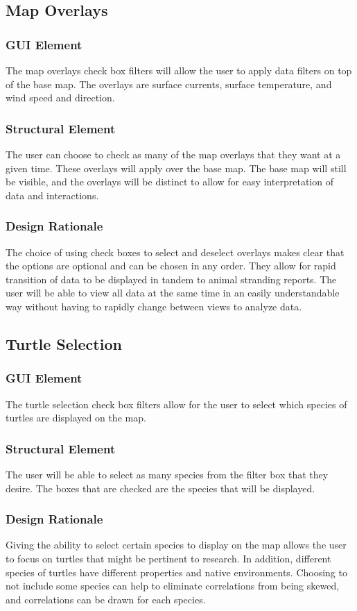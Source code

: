 \documentclass[onecolumn, draftclsnofoot,10pt, compsoc]{IEEEtran}
\begin{document}
\begin{singlespace}
        \subsection{Map Overlays}
            \subsubsection{GUI Element}
            The map overlays check box filters will allow the user to apply data filters on top of the base map.  The overlays are surface currents, surface temperature, and wind speed and direction.
            \subsubsection{Structural Element}
            The user can choose to check as many of the map overlays that they want at a given time.  These overlays will apply over the base map.  The base map will still be visible, and the overlays will be distinct to allow for easy interpretation of data and interactions.
            \subsubsection{Design Rationale}
            The choice of using check boxes to select and deselect overlays makes clear that the options are optional and can be chosen in any order.  They allow for rapid transition of data to be displayed in tandem to animal stranding reports.  The user will be able to view all data at the same time in an easily understandable way without having to rapidly change between views to analyze data.
    \subsection{Turtle Selection}
            \subsubsection{GUI Element}
            The turtle selection check box filters allow for the user to select which species of turtles are displayed on the map.
            \subsubsection{Structural Element}
            The user will be able to select as many species from the filter box that they desire.  The boxes that are checked are the species that will be displayed.
            \subsubsection{Design Rationale}
            Giving the ability to select certain species to display on the map allows the user to focus on turtles that might be pertinent to research.  In addition, different species of turtles have different properties and native environments.  Choosing to not include some species can help to eliminate correlations from being skewed, and correlations can be drawn for each species.

\end{singlespace}
\end{document}
